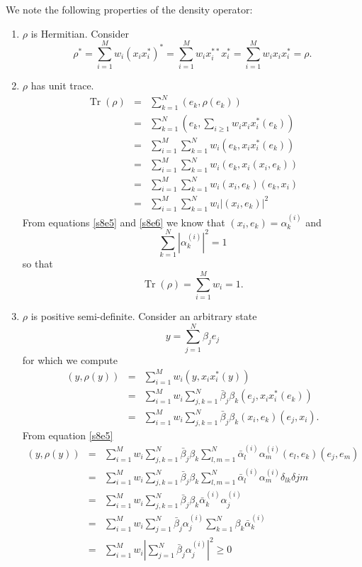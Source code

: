 \documentclass{article}
\numberwithin{equation}{section}
\DeclareMathOperator{\Tr}{Tr}
\theoremstyle{plain}
\numberwithin{thm}{section}
\theoremstyle{plain}
\numberwithin{prop}{section}
\theoremstyle{definition}
\numberwithin{defn}{section}
\theoremstyle{remark}
\begin{document}
We note the following properties of the density operator:
\begin{enumerate}
\item $\rho$ is Hermitian. Consider
\begin{equation}\label{s8e15}
\rho^\ast = \sum_{i=1}^Mw_i(x_ix_i^\ast)^\ast = 
\sum_{i=1}^Mw_i x_i^{\ast\ast}x_i^\ast = \sum_{i=1}^Mw_i x_ix_i^\ast = \rho.
\end{equation}
\item $\rho$ has unit trace.
\begin{eqnarray}
\Tr(\rho) &=& \sum_{k=1}^N(e_k, \rho(e_k)) \nonumber \\
 &=&\sum_{k=1}^N\left(e_k, \sum_{i \ge 1}w_i x_ix_i^\ast(e_k)\right)\nonumber\\
 &=&\sum_{i=1}^M\sum_{k=1}^Nw_i(e_k, x_ix_i^\ast(e_k)) \nonumber \\
 &=&\sum_{i=1}^M\sum_{k=1}^N w_i(e_k, x_i(x_i, e_k)) \nonumber \\
 &=&\sum_{i=1}^M\sum_{k=1}^N w_i(x_i, e_k)(e_k, x_i) \nonumber \\
 &=&\sum_{i=1}^M\sum_{k=1}^N w_i |(x_i, e_k)|^2 \label{s8e16}
\end{eqnarray}
From equations \eqref{s8e5} and \eqref{s8e6} we know that $(x_i, e_k) = 
\alpha_k^{(i)}$ and 
\begin{equation}\label{s8e17}
\sum_{k=1}^N |\alpha_k^{(i)}|^2 = 1
\end{equation}
so that
\begin{equation}\label{s8e18}
\Tr(\rho) = \sum_{i=1}^Mw_i = 1.
\end{equation}

\item $\rho$ is positive semi-definite. Consider an arbitrary state 
\begin{equation}\label{s8e19}
y = \sum_{j=1}^N\beta_j e_j
\end{equation}
for which we compute
\begin{eqnarray}
(y, \rho(y)) &=& \sum_{i=1}^Mw_i(y, x_ix_i^\ast(y)) \nonumber \\
 &=& \sum_{i=1}^Mw_i\sum_{j,k=1}^N\bar{\beta}_j\beta_k(e_j, x_ix_i^\ast(e_k))
\nonumber \\
 &=& \sum_{i=1}^Mw_i\sum_{j,k=1}^N\bar{\beta}_j\beta_k(x_i, e_k)(e_j, x_i).
\nonumber
\end{eqnarray}
From equation \eqref{s8e5}
\begin{eqnarray}
(y,\rho(y)) &=& \sum_{i=1}^Mw_i\sum_{j,k=1}^N\bar{\beta}_j\beta_k
\sum_{l,m=1}^N \bar{\alpha}_l^{(i)}\alpha_m^{(i)}(e_l, e_k)(e_j, e_m) 
\nonumber \\
 &=& \sum_{i=1}^Mw_i\sum_{j,k=1}^N\bar{\beta}_j\beta_k
\sum_{l,m=1}^N \bar{\alpha}_l^{(i)}\alpha_m^{(i)}\delta_{lk}\delta{jm}
\nonumber \\
 &=& \sum_{i=1}^Mw_i\sum_{j,k=1}^N\bar{\beta}_j\beta_k\bar{\alpha}_k^{(i)}
\alpha_j^{(i)} \nonumber \\
 &=& \sum_{i=1}^Mw_i\sum_{j=1}^N\bar{\beta}_j\alpha_j^{(i)}
 \sum_{k=1}^N\beta_k\bar{\alpha}_k^{(i)} \nonumber \\
 &=& \sum_{i=1}^Mw_i\left|\sum_{j=1}^N\bar{\beta}_j\alpha_j^{(i)}\right|^2
 \ge 0 \label{s8e20}
\end{eqnarray}


\end{enumerate}
\end{document}
